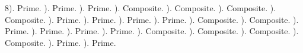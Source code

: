 \documentclass{article}%
\begin{document}
8). Prime.%
). Prime.%
). Prime.%
). Composite.%
). Composite.%
). Composite.%
). Composite.%
). Prime.%
). Prime.%
). Prime.%
). Prime.%
). Composite.%
). Composite.%
). Prime.%
). Prime.%
). Prime.%
). Prime.%
). Composite.%
). Composite.%
). Composite.%
). Composite.%
). Prime.%
). Prime.%
\newline%
\newpage%
\end{document}
